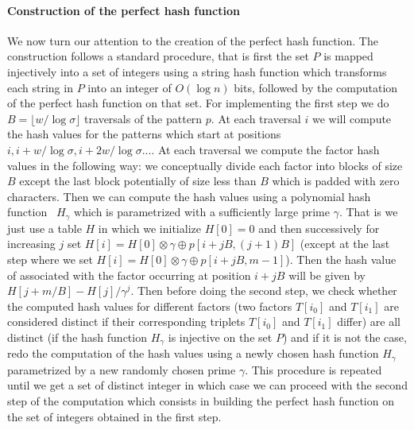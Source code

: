 \documentclass{article}
\newcommand{\?}{\mskip1.5mu}
\begin{document}
\paragraph{Construction of the perfect hash function}
We now turn our attention to the creation of the perfect hash function. The construction follows a standard procedure, that is first the set $P$ is mapped injectively into a set of integers using a string hash function which transforms each string in $P$ into an integer of $O(\log n)$ bits, followed by the computation of the perfect hash function on that set. For implementing the first step we do $B=\lfloor w/\log\sigma\rfloor$ traversals of the pattern $p$. At each traversal $i$ we will compute the hash values for the patterns which start at positions $i,i+w/\log\sigma,i+2w/\log\sigma...$.  
At each traversal we compute the factor hash values in the following way: we conceptually divide each factor into blocks of size $B$ except the last block potentially of size less than $B$ which is padded with zero characters. Then we can compute the hash values using a polynomial hash function~\cite[section 5]{DGMP} $H_\gamma$ which is parametrized with a sufficiently large prime $\gamma$. That is we just use a table $H$ in which we initialize $H[0]=0$ and then successively for increasing $j$ set $H[i]=H[0]\otimes \gamma\oplus p[i+jB,(j+1)B]$ (except at the last step where we set $H[i]=H[0]\otimes \gamma\oplus p[i+jB,m-1]$). Then the hash value of associated with the factor occurring at position $i+jB$ will be given by $H[j+m/B]-H[j]/\gamma^j$. 
Then before doing the second step, we check whether the computed hash values for different factors (two factors $T[i_0]$ and $T[i_1]$ are considered distinct if their corresponding triplets $T[i_0]$ and $T[i_1]$ differ) are all distinct (if the hash function $H_\gamma$ is injective on the set $P$) and if it is not the case, redo the computation of the hash values using a newly chosen hash function $H_\gamma$ parametrized by a new randomly chosen prime $\gamma$. This procedure is repeated until we get a set of  distinct integer in which case we can proceed with the second step of the computation which consists in building the perfect hash function on the set of integers obtained in the first step. 
\end{document}
